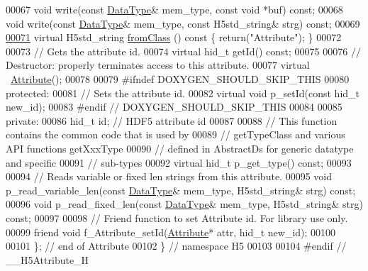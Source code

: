 \begin{DoxyCode}
00067         \textcolor{keywordtype}{void} write(\textcolor{keyword}{const} \hyperlink{class_h5_1_1_data_type}{DataType}& mem\_type, \textcolor{keyword}{const} \textcolor{keywordtype}{void} *buf) \textcolor{keyword}{const};
00068         \textcolor{keywordtype}{void} write(\textcolor{keyword}{const} \hyperlink{class_h5_1_1_data_type}{DataType}& mem\_type, \textcolor{keyword}{const} H5std\_string& strg) \textcolor{keyword}{const};
00069 
\hyperlink{class_h5_1_1_attribute_a2ede405f542c51aebc38cfcadfdd7d95}{00071}         \textcolor{keyword}{virtual} H5std\_string \hyperlink{class_h5_1_1_attribute_a2ede405f542c51aebc38cfcadfdd7d95}{fromClass} ()\textcolor{keyword}{ const }\{ \textcolor{keywordflow}{return}(\textcolor{stringliteral}{"Attribute"}); \}
00072 
00073         \textcolor{comment}{// Gets the attribute id.}
00074         \textcolor{keyword}{virtual} hid\_t getId() \textcolor{keyword}{const};
00075 
00076         \textcolor{comment}{// Destructor: properly terminates access to this attribute.}
00077         \textcolor{keyword}{virtual} ~\hyperlink{class_h5_1_1_attribute}{Attribute}();
00078 
00079 \textcolor{preprocessor}{#ifndef DOXYGEN\_SHOULD\_SKIP\_THIS}
00080    \textcolor{keyword}{protected}:
00081         \textcolor{comment}{// Sets the attribute id.}
00082         \textcolor{keyword}{virtual} \textcolor{keywordtype}{void} p\_setId(\textcolor{keyword}{const} hid\_t new\_id);
00083 \textcolor{preprocessor}{#endif // DOXYGEN\_SHOULD\_SKIP\_THIS}
00084 
00085    \textcolor{keyword}{private}:
00086         hid\_t id;        \textcolor{comment}{// HDF5 attribute id}
00087 
00088         \textcolor{comment}{// This function contains the common code that is used by}
00089         \textcolor{comment}{// getTypeClass and various API functions getXxxType}
00090         \textcolor{comment}{// defined in AbstractDs for generic datatype and specific}
00091         \textcolor{comment}{// sub-types}
00092         \textcolor{keyword}{virtual} hid\_t p\_get\_type() \textcolor{keyword}{const};
00093 
00094         \textcolor{comment}{// Reads variable or fixed len strings from this attribute.}
00095         \textcolor{keywordtype}{void} p\_read\_variable\_len(\textcolor{keyword}{const} \hyperlink{class_h5_1_1_data_type}{DataType}& mem\_type, H5std\_string& strg) \textcolor{keyword}{const};
00096         \textcolor{keywordtype}{void} p\_read\_fixed\_len(\textcolor{keyword}{const} \hyperlink{class_h5_1_1_data_type}{DataType}& mem\_type, H5std\_string& strg) \textcolor{keyword}{const};
00097 
00098         \textcolor{comment}{// Friend function to set Attribute id.  For library use only.}
00099         \textcolor{keyword}{friend} \textcolor{keywordtype}{void} f\_Attribute\_setId(\hyperlink{class_h5_1_1_attribute}{Attribute}* attr, hid\_t new\_id);
00100 
00101 \}; \textcolor{comment}{// end of Attribute}
00102 \} \textcolor{comment}{// namespace H5}
00103 
00104 \textcolor{preprocessor}{#endif // \_\_H5Attribute\_H}
\end{DoxyCode}
